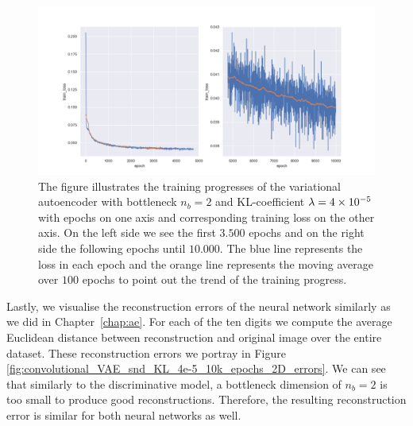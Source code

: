 \begin{figure}
\begin{center}
\includegraphics[width=\linewidth]{convolutional_VAE_snd_KL_4e-5_10k_epochs_2D_training_progress}
\end{center}
\caption{The figure illustrates the training progresses of the variational autoencoder with bottleneck $n_b=2$ and KL-coefficient $\lambda = \num{4e-5}$ with epochs on one axis and corresponding training loss on the other axis. On the left side we see the first $3.500$ epochs and on the right side the following epochs until $10.000$. The blue line represents the loss in each epoch and the orange line represents the moving average over $100$ epochs to point out the trend of the training progress.}\label{fig:convolutional_VAE_snd_KL_4e-5_10k_epochs_2D_training_progress}
\end{figure}

Lastly, we visualise the reconstruction errors of the neural network similarly as we did in Chapter~\ref{chap:ae}. For each of the ten digits we compute the average Euclidean distance between reconstruction and original image over the entire dataset. These reconstruction errors we portray in Figure \ref{fig:convolutional_VAE_snd_KL_4e-5_10k_epochs_2D_errors}. We can see that similarly to the discriminative model, a bottleneck dimension of $n_b=2$ is too small to produce good reconstructions. Therefore, the resulting reconstruction error is similar for both neural networks as well.


